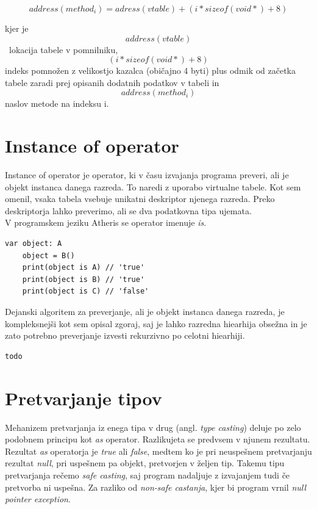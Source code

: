 \documentclass[a4paper, 12p]{book}
\begin{document}
\[ address(method_i) = adress(vtable) + (i * sizeof(void*) + 8) \]

kjer je \[address(vtable)\]\ lokacija tabele v pomnilniku, \[(i * sizeof(void*) + 8)\] indeks pomnožen z velikostjo kazalca (običajno 4 byti) plus odmik od začetka tabele zaradi prej opisanih dodatnih podatkov v tabeli in \[ address(method_i)\] naslov metode na indeksu i.

\section{Instance of operator}

Instance of operator je operator, ki v času izvajanja programa preveri, ali je objekt instanca danega razreda. To naredi z uporabo virtualne tabele. Kot sem omenil, vsaka tabela vsebuje unikatni deskriptor njenega razreda. Preko deskriptorja lahko preverimo, ali se dva podatkovna tipa ujemata. \\
\indent V programskem jeziku Atheris se operator imenuje \textit{is}.

\begin{lstlisting}[caption={Uporaba operatorja \textit{is} za razrede iz sheme ~\ref{vtables}}, captionpos=b]
	var object: A
	object = B()
	print(object is A) // 'true'
	print(object is B) // 'true'
	print(object is C) // 'false'
\end{lstlisting}

Dejanski algoritem za preverjanje, ali je objekt instanca danega razreda, je  kompleksnejši kot sem opisal zgoraj, saj je lahko razredna hiearhija obsežna in je zato potrebno preverjanje izvesti rekurzivno po celotni hiearhiji.

\begin{lstlisting}[caption={Algoritem za izračun ali je objekt instanca danega razeda}, captionpos=b]
todo
\end{lstlisting}

\newpage

\section{Pretvarjanje tipov}

Mehanizem pretvarjanja iz enega tipa v drug (angl. \textit{type casting}) deluje po zelo podobnem principu kot \textit{as} operator. Razlikujeta se predvsem v njunem rezultatu. Rezultat \textit{as} operatorja je \textit{true} ali \textit{false}, medtem ko je pri neuspešnem pretvarjanju rezultat \textit{null}, pri uspešnem pa objekt, pretvorjen v željen tip. Takemu tipu pretvarjanja rečemo \textit{safe casting}, saj program nadaljuje z izvajanjem tudi če pretvorba ni uspešna. Za razliko od \textit{non-safe castanja}, kjer bi program vrnil \textit{null pointer exception}.
\end{document}
